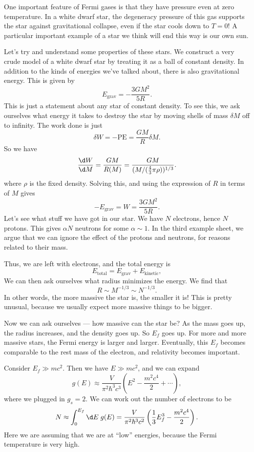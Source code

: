 \documentclass[a4paper]{article}
\begin{document}
One important feature of Fermi gases is that they have pressure even at zero temperature. In a white dwarf star, the degeneracy pressure of this gas supports the star against gravitational collapse, even if the star cools down to $T = 0$! A particular important example of a star we think will end this way is our own sun.

Let's try and understand some properties of these stars. We construct a very crude model of a white dwarf star by treating it as a ball of constant density. In addition to the kinds of energies we've talked about, there is also gravitational energy. This is given by
\[
  E_{\mathrm{grav}} = -\frac{3 GM^2}{5R}.
\]
This is just a statement about any star of constant density. To see this, we ask ourselves what energy it takes to destroy the star by moving shells of mass $\delta M$ off to infinity. The work done is just
\[
  \delta W = -\mathrm{PE} = \frac{GM}{R} \delta M.
\]
So we have
\[
  \frac{\d W}{\d M} = \frac{GM}{R(M)} = \frac{GM}{(M/(\frac{4}{3} \pi \rho))^{1/3}}.
\]
where $\rho$ is the fixed density. Solving this, and using the expression of $R$ in terms of $M$ gives
\[
  -E_{\mathrm{grav}} = W = \frac{3 GM^2}{5R}.
\]
Let's see what stuff we have got in our star. We have $N$ electrons, hence $N$ protons. This gives $\alpha N$ neutrons for some $\alpha \sim 1$. In the third example sheet, we argue that we can ignore the effect of the protons and neutrons, for reasons related to their mass.

Thus, we are left with electrons, and the total energy is
\[
  E_{\mathrm{total}} = E_{\mathrm{grav}} + E_{\mathrm{kinetic}},
\]
We can then ask ourselves what radius minimizes the energy. We find that
\[
  R \sim M^{-1/3} \sim N^{-1/3}.
\]
In other words, the more massive the star is, the smaller it is! This is pretty unusual, because we usually expect more massive things to be bigger.

Now we can ask ourselves --- how massive can the star be? As the mass goes up, the radius increases, and the density goes up. So $E_f$ goes up. For more and more massive stars, the Fermi energy is larger and larger. Eventually, this $E_f$ becomes comparable to the rest mass of the electron, and relativity becomes important.

Consider $E_f \gg mc^2$. Then we have $E \gg mc^2$, and we can expand
\[
  g(E) \approx \frac{V}{\pi^2 \hbar^3 c^3}\left(E^2 - \frac{m^2 c^4}{2} + \cdots\right),
\]
where we plugged in $g_s = 2$. We can work out the number of electrons to be
\[
  N \approx \int_0^{E_f} \d E\; g(E) = \frac{V}{\pi^2 \hbar^3 c^2} \left(\frac{1}{3} E^3_f - \frac{m^2 c^4}{2}\right).
\]
Here we are assuming that we are at ``low'' energies, because the Fermi temperature is very high.
\end{document}
